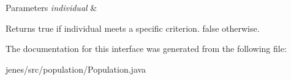 \begin{DoxyParams}{Parameters}
{\em individual} & \\
\hline
\end{DoxyParams}
\begin{DoxyReturn}{Returns}
{\ttfamily true} if individual meets a specific criterion. {\ttfamily  false } otherwise. 
\end{DoxyReturn}


The documentation for this interface was generated from the following file\-:\begin{DoxyCompactItemize}
\item 
jenes/src/population/Population.\-java\end{DoxyCompactItemize}
